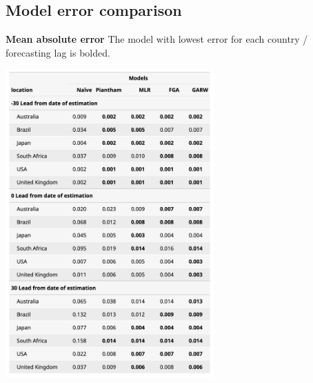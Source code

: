 \documentclass[11pt,oneside,letterpaper]{article}
\begin{document}
\subsection*{Model error comparison}

\begin{table}[tb!]
	\centering
	\caption{
		\textbf{Mean absolute error}
		The model with lowest error for each country / forecasting lag is bolded.
		}
	\includegraphics[width=0.6\textwidth]{figures/model_comp_table.png}
	\label{table:model_comp_table}
\end{table}
\end{document}
